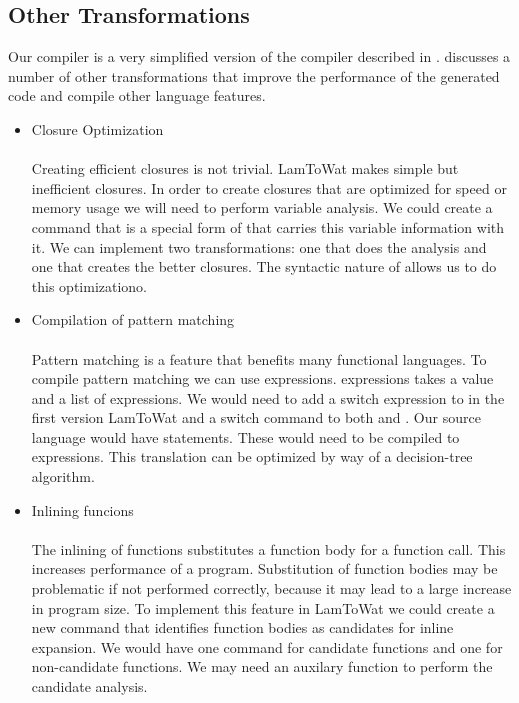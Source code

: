 \subsection{\label{subsection:othert}Other Transformations}
Our compiler is a very simplified version of the compiler described in  \autocite{DBLP:books/daglib/0022396}. \citeauthor{DBLP:books/daglib/0022396} discusses a number of other transformations that improve the performance of the generated code and compile other language features.

\begin{itemize}
\item Closure Optimization\\\\
Creating efficient closures is not trivial. LamToWat makes simple but inefficient closures. In order to create closures that are optimized for speed or memory usage we will need to perform variable analysis. We could create a command that is a special form of  that carries this variable information with it. We can implement two transformations: one that does the analysis and one that creates the better closures. The syntactic nature of  allows us to do this optimizationo.
\item Compilation of pattern matching\\\\
Pattern matching is a feature that benefits many functional languages. To compile pattern matching we can use  expressions.  expressions takes a value and a list of expressions. We would need to add a switch expression to  in the first version LamToWat and a switch command to both  and . Our source language would have  statements. These would need to be compiled to  expressions. This translation can be optimized by way of a decision-tree algorithm.
\item Inlining funcions\\\\
The inlining of functions substitutes a function body for a function call. This increases performance of a program. Substitution of function bodies may be problematic if not performed correctly, because it may lead to a large increase in program size. To implement this feature in LamToWat we could create a new command that identifies function bodies as candidates for inline expansion. We would have one command for candidate functions and one for non-candidate functions. We may need an auxilary function to perform the candidate analysis.
\end{itemize}
